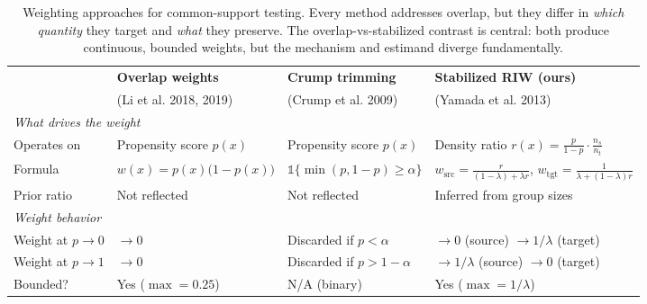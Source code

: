 \begin{table}[t]
  \centering
  \small
  \caption{Weighting approaches for common-support testing. Every method addresses overlap, but they
    differ in \emph{which quantity} they target and \emph{what} they preserve.
    The overlap-vs-stabilized contrast is central: both produce continuous, bounded weights,
    but the mechanism and estimand diverge fundamentally.}
  \label{tab:weighting-benchmarks}
  \begin{tabular}{lp{4.8cm}p{4.8cm}p{4.8cm}}
    \toprule
    & \textbf{Overlap weights}
    & \textbf{Crump trimming}
    & \textbf{Stabilized RIW (ours)} \\
    & (Li et al. 2018, 2019)
    & (Crump et al. 2009)
    & (Yamada et al. 2013) \\
    \midrule
    \multicolumn{4}{l}{\textit{What drives the weight}} \\
    \hspace{1em} Operates on
    & Propensity score $p(x)$
    & Propensity score $p(x)$
    & Density ratio $r(x) = \frac{p}{1-p} \cdot \frac{n_s}{n_t}$ \\
    \hspace{1em} Formula
    & $w(x) = p(x)\bigl(1-p(x)\bigr)$
    & $\mathbb{1}\{\min(p,1-p) \ge \alpha\}$
    & $w_{\mathrm{src}}\!=\!\frac{r}{(1-\lambda)+\lambda r}$,\;
      $w_{\mathrm{tgt}}\!=\!\frac{1}{\lambda+(1-\lambda)r}$ \\
    \hspace{1em} Prior ratio
    & Not reflected
    & Not reflected
    & Inferred from group sizes \\
    \midrule
    \multicolumn{4}{l}{\textit{Weight behavior}} \\
    \hspace{1em} Weight at $p\to0$
    & $\to 0$
    & Discarded if $p < \alpha$
    & $\to 0$ (source) \; $\to 1/\lambda$ (target) \\
    \hspace{1em} Weight at $p\to1$
    & $\to 0$
    & Discarded if $p > 1-\alpha$
    & $\to 1/\lambda$ (source) \; $\to 0$ (target) \\
    \hspace{1em} Bounded?
    & Yes ($\max = 0.25$)
    & N/A (binary)
    & Yes ($\max = 1/\lambda$) \\

\end{tabular}
\end{table}
